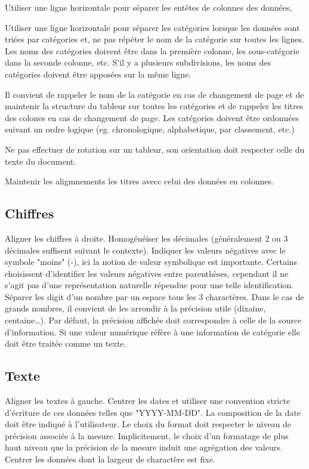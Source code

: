 \documentclass[a4paper,12pt]{article}
\begin{document}
\begin{multicols}{2}
Utiliser une ligne horizontale pour séparer les entêtes de colonnes des données,

Utiliser une ligne horizontale pour séparer les catégories lorsque les données sont triées par catégories et, ne pas répéter le nom de la catégorie sur toutes les lignes. Les noms des catégories doivent être dans la première colonne, les sous-catégorie dans la seconde colonne, etc. S'il y a plusieurs subdivisions, les noms des catégories doivent être apposées sur la même ligne.

Il convient de rappeler le nom de la catégorie en cas de changement de page et de maintenir la structure du tableur sur toutes les catégories et de rappeler les titres des colones en cas de changement de page.
Les catégories doivent être ordonnées suivant un ordre logique (eg. chronologique, alphabetique, par classement, etc.)

Ne pas effectuer de rotation sur un tableur, son orientation doit respecter celle du texte du document.

Maintenir les aligmnements les titres avecc celui des données en colonnes.
\subsection*{Chiffres}
\label{sec:orgc80d1c1}
Aligner les chiffres à droite.
Homogénéiser les décimales (généralement 2 ou 3 décimales suffisent suivant le contexte).
Indiquer les valeurs négatives avec le symbole "moins" (-), ici la notion de valeur symbolique est importante. Certains choisissent d'identifier les valeurs négatives entre parenthèses, cependant il ne s'agit pas d'une représentation naturelle répendue pour une telle identification.
Séparer les digit d'un nombre par un espace tous les 3 charactères. Dans le cas de grands nombres, il convient de les arrondir à la précision utile (dixaine, centaine\ldots{}). Par défaut, la précision affichée doit correspondre à celle de la source d'information.
Si une valeur numérique réfère à une information de catégorie elle doit être traitée comme un texte.
\subsection*{Texte}
\label{sec:org474e337}
Aligner les textes à gauche.
Centrer les dates et utiliser une convention stricte d'écriture de ces données telles que "YYYY-MM-DD". \autocite{ISO8601-1DateHeureRepresentations2019} La composition de la date doit être indiqué à l'utilisateur. Le choix du format doit respecter le niveau de précision associée à la mesure. Implicitement, le choix d'un formatage de plus haut niveau que la précision de la mesure induit une agrégation des valeurs.
Centrer les données dont la largeur de charactère est fixe.

\end{multicols}
\end{document}
